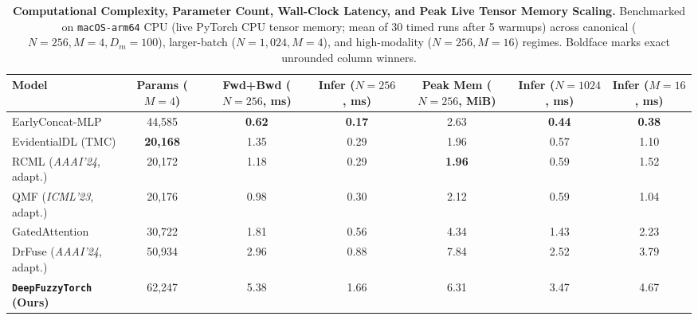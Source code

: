 \documentclass[10pt,twocolumn]{article}
\begin{document}
\begin{table}[t]
\centering
\caption{\textbf{Computational Complexity, Parameter Count, Wall-Clock Latency, and Peak Live
Tensor Memory Scaling.} Benchmarked on \texttt{macOS-arm64} CPU (live PyTorch CPU tensor
memory; mean of 30 timed runs after 5 warmups) across canonical ($N=256, M=4, D_m=100$),
larger-batch ($N=1,024, M=4$), and high-modality ($N=256, M=16$) regimes. Boldface marks
exact unrounded column winners.}
\label{tab:runtime}
\footnotesize
\setlength{\tabcolsep}{5.0pt}
\begin{tabular}{@{}lcccccc@{}}
\toprule
\textbf{Model} & \shortstack{\textbf{Params}\\\textbf{($M=4$)}} &
\shortstack{\textbf{Fwd+Bwd}\\\textbf{($N=256$, ms)}} &
\shortstack{\textbf{Infer}\\\textbf{($N=256$, ms)}} & \shortstack{\textbf{Peak
Mem}\\\textbf{($N=256$, MiB)}} & \shortstack{\textbf{Infer}\\\textbf{($N=1024$, ms)}} &
\shortstack{\textbf{Infer}\\\textbf{($M=16$, ms)}} \\
\midrule
EarlyConcat-MLP \cite{baltrusaitis2018multimodal} & 44,585 & \textbf{0.62} & \textbf{0.17} &
2.63 & \textbf{0.44} & \textbf{0.38} \\
EvidentialDL (TMC) \cite{han2022trusted} & \textbf{20,168} & 1.35 & 0.29 & 1.96 & 0.57 & 1.10
\\
RCML (\textit{AAAI'24}, adapt.) \cite{xu2024reliable} & 20,172 & 1.18 & 0.29 & \textbf{1.96} &
0.59 & 1.52 \\
QMF (\textit{ICML'23}, adapt.) \cite{zhang2023provable} & 20,176 & 0.98 & 0.30 & 2.12 & 0.59 &
1.04 \\
GatedAttention \cite{arevalo2017gated} & 30,722 & 1.81 & 0.56 & 4.34 & 1.43 & 2.23 \\
DrFuse (\textit{AAAI'24}, adapt.) \cite{yao2024drfuse} & 50,934 & 2.96 & 0.88 & 7.84 & 2.52 &
3.79 \\
\midrule
\textbf{\texttt{DeepFuzzyTorch} (Ours)} & 62,247 & 5.38 & 1.66 & 6.31 & 3.47 & 4.67 \\
\bottomrule
\end{tabular}
\end{table}
\end{document}
